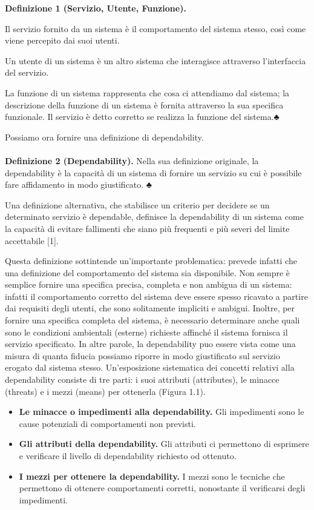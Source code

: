 \documentclass[14pt]{extarticle}
\begin{document}
\textbf{Definizione 1 (Servizio, Utente, Funzione).}

Il servizio fornito da un sistema
è il comportamento del sistema stesso, così come viene percepito dai suoi utenti.

Un utente di un sistema è un altro sistema che interagisce attraverso l’interfaccia del
servizio.

La funzione di un sistema rappresenta che cosa ci attendiamo dal sistema; la
descrizione della funzione di un sistema è fornita attraverso la sua specifica funzionale.
Il servizio è detto corretto se realizza la funzione del sistema.♣

Possiamo ora fornire una definizione di dependability.\\\\
\textbf{Definizione 2 (Dependability).} Nella sua definizione originale, la dependability è
la capacità di un sistema di fornire un servizio su cui è possibile fare affidamento in
modo giustificato.
♣

Una definizione alternativa, che stabilisce un criterio per decidere se un determinato servizio è dependable, definisce la dependability di un sistema
come la capacità di evitare fallimenti che siano più frequenti e più severi del
limite accettabile [1].

Questa definizione sottintende un’importante problematica: prevede infatti che una definizione del comportamento del sistema sia disponibile. Non
sempre è semplice fornire una specifica precisa, completa e non ambigua di
un sistema: infatti il comportamento corretto del sistema deve essere spesso
ricavato a partire dai requisiti degli utenti, che sono solitamente impliciti e
ambigui. Inoltre, per fornire una specifica completa del sistema, è necessario determinare anche quali sono le condizioni ambientali (esterne) richieste
affinché il sistema fornisca il servizio specificato.
In altre parole, la dependability puo essere vista come una misura di quanta fiducia possiamo riporre in modo giustificato sul servizio erogato dal sistema
stesso. Un’esposizione sistematica dei concetti relativi alla dependability consiste di tre parti: i suoi attributi (attributes), le minacce (threats) e i mezzi (means) per ottenerla (Figura 1.1).

\begin{itemize}
\item \textbf{Le minacce o impedimenti alla dependability.} Gli impedimenti sono le
cause potenziali di comportamenti non previsti.
\item \textbf{Gli attributi della dependability.} Gli attributi ci permettono di esprimere
e verificare il livello di dependability richiesto od ottenuto.
\item \textbf{I mezzi per ottenere la dependability.} I mezzi sono le tecniche che
permettono di ottenere comportamenti corretti, nonostante il verificarsi
degli impedimenti.
\end{itemize}
\end{document}

